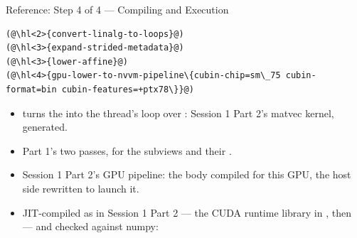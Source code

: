 \documentclass[aspectratio=169,10pt]{beamer}
\begin{document}
\begin{frame}[fragile]{Reference: Step 4 of 4 --- Compiling and Execution}
\begin{lstlisting}[style=plain,basicstyle=\ttfamily\scriptsize]
(@\hl<2>{convert-linalg-to-loops}@)
(@\hl<3>{expand-strided-metadata}@)
(@\hl<3>{lower-affine}@)
(@\hl<4>{gpu-lower-to-nvvm-pipeline\{cubin-chip=sm\_75 cubin-format=bin cubin-features=+ptx78\}}@)
\end{lstlisting}
  \vspace{0.3em}
  \begin{itemize}
    \item<2->  turns the  into
      the thread's loop over : Session 1 Part 2's matvec kernel,
      generated.
    \item<3-> Part 1's two passes, for the subviews and their
      .
    \item<4-> Session 1 Part 2's GPU pipeline: the body compiled for this GPU,
      the host side rewritten to launch it.
    \item<5-> JIT-compiled as in Session 1 Part 2 --- the CUDA runtime library
      in , then  --- and checked
      against numpy:
  \end{itemize}
  \vspace{0.2em}
\end{frame}
\end{document}
